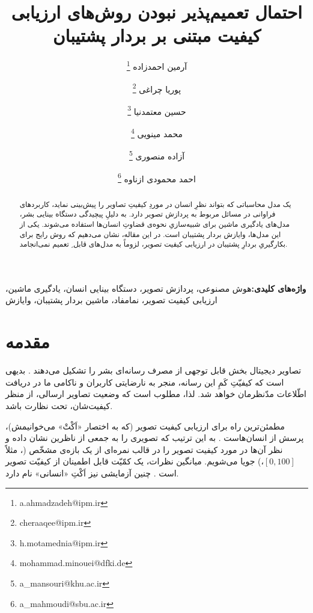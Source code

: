 \documentclass[twocolumn]{article}
\newcommand{\mykeyword}[1]{\par\textbf{واژه‌های کلیدی:}{#1}}
\begin{document}
\title{احتمال تعمیم‌پذیر نبودن روش‌های ارزیابی کیفیت مبتنی بر بردار پشتیبان}

\author[1]{آرمین احمدزاده \thanks{a.ahmadzadeh@ipm.ir}}
\author[2]{پوریا چراغی \thanks{cheraaqee@ipm.ir}}
\author[3]{حسین معتمدنیا \thanks{h.motamednia@ipm.ir}}
\author[4]{محمد مینویی \thanks{mohammad.minouei@dfki.de}}
\author[5]{آزاده منصوری \thanks{a\_mansouri@khu.ac.ir}}
\author[6]{احمد محمودی ازناوه \thanks{a\_mahmoudi@sbu.ac.ir}}
\date{}

\maketitle
\begin{abstract}
	یک مدل محاسباتی که بتواند نظرِ انسان در موردِ کیفیتِ تصاویر را پیش‌بینی نماید، کاربردهای فراوانی در مسائل مربوط به پردازش تصویر دارد. به دلیلِ پیچیدگی دستگاه بینایی بشر، مدل‌های یادگیری ماشین برای شبیه‌سازیِ نحوه‌ی قضاوتِ انسان‌ها استفاده می‌شوند. یکی از این مدل‌ها، وایازش بردار پشتیبان است. در این مقاله، نشان می‌دهیم که روش رایج برای بکارگیریِ بردارِ پشتیبان در ارزیابی کیفیت تصویر، لزوماً به مدل‌های قابل ِ تعمیم نمی‌انجامد.
\end{abstract}
\mykeyword{هوش مصنوعی، پردازش تصویر، دستگاه بینایی انسان، یادگیری ماشین، ارزیابی کیفیت تصویر، نمامفاد، ماشین بردار پشتیبان، وایازش }




\section{مقدمه}
\label{sec:intro}
تصاویر دیجیتال بخش قابل توجهی از مصرف رسانه‌ای بشر را تشکیل می‌دهند \cite{cisco}. بدیهی است که کیفیّتِ کَمِ این رسانه، منجر به نارضایتی کاربران و ناکامی ما در دریافت اطّلاعات مدّنظرمان خواهد شد. لذا، مطلوب است که وضعیت تصاویر ارسالی، از منظر کیفیت‌شان، تحت نظارت باشد.

مطمئن‌ترین راه برای ارزیابی کیفیت تصویر (که به اختصار «اَکْتْ» می‌خوانیمش)، پرسش از انسان‌هاست \cite{allen2012manual}. به این ترتیب که تصویری را به جمعی از ناظرین نشان داده و نظر آن‌ها در مورد کیفیت تصویر را در قالب نمره‌ای از یک بازه‌ی مشخّص (، مثلاً $[0, 100]$،) جویا می‌شویم. میانگین نظرات، یک کمّیّت قابل اطمینان از کیفیّت تصویر است \cite{mohammadi2014subjective}. چنین آزمایشی نیز اَکْتِ «انسانی» نام دارد.
\end{document}
